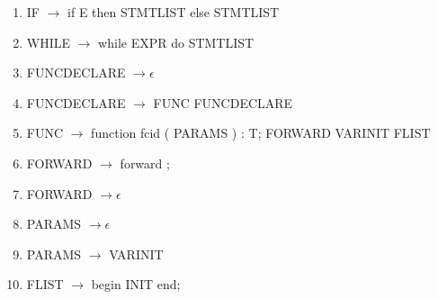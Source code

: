 \documentclass[a4paper]{article}
\begin{document}
\begin{enumerate}
\item{IF $\rightarrow$ if E then STMTLIST else STMTLIST } 
\item{WHILE $\rightarrow$ while EXPR do STMTLIST } 
\item{FUNCDECLARE $\rightarrow \epsilon$ } 
\item{FUNCDECLARE $\rightarrow$ FUNC FUNCDECLARE } 
\item{FUNC $\rightarrow$ function fcid ( PARAMS ) : T; FORWARD VARINIT FLIST } 
\item{FORWARD $\rightarrow$ forward ; } 
\item{FORWARD $\rightarrow \epsilon$ } 
\item{PARAMS $\rightarrow \epsilon$ } 
\item{PARAMS $\rightarrow$ VARINIT } 
\item{FLIST $\rightarrow$ begin INIT end; }
\end{enumerate}
\end{document}
